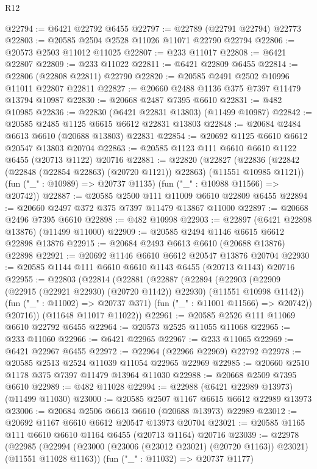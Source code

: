 \begin{lexlean}{R12}
\begin{coremodule}
@22794 := @6421 @22792 @6455
@22797 := @22789 (@22791 @22794) @22773
@22803 := @20585 @2504 @2528 @11026 @11071 @22790 @22794
@22806 := @20573 @2503 @11012 @11025
@22807 := @233 @11017
@22808 := @6421 @22807
@22809 := @233 @11022
@22811 := @6421 @22809 @6455
@22814 := @22806 (@22808 @22811) @22790
@22820 := @20585 @2491 @2502 @10996 @11011 @22807 @22811
@22827 := @20660 @2488 @1136 @375 @7397 @11479 @13794 @10987
@22830 := @20668 @2487 @7395 @6610
@22831 := @482 @10985
@22836 := @22830 (@6421 @22831 @13803) (@11499 @10987)
@22842 := @20585 @2485 @1125 @6615 @6612 @22831 @13803
@22848 := @20684 @2484 @6613 @6610 (@20688 @13803) @22831
@22854 := @20692 @1125 @6610 @6612 @20547 @13803 @20704
@22863 := @20585 @1123 @111 @6610 @6610 @1122 @6455 (@20713 @1122) @20716
@22881 := @22820
    (@22827
      (@22836 (@22842 (@22848 (@22854 @22863) (@20720 @1121)) @22863) (@11551 @10985 @1121))
      (fun ("_" : @10989) => @20737 @1135)
      (fun ("_" : @10988 @11566) => @20742))
@22887 := @20585 @2500 @111 @11009 @6610 @22809 @6455
@22894 := @20660 @2497 @372 @375 @7397 @11479 @13867 @11000
@22897 := @20668 @2496 @7395 @6610
@22898 := @482 @10998
@22903 := @22897 (@6421 @22898 @13876) (@11499 @11000)
@22909 := @20585 @2494 @1146 @6615 @6612 @22898 @13876
@22915 := @20684 @2493 @6613 @6610 (@20688 @13876) @22898
@22921 := @20692 @1146 @6610 @6612 @20547 @13876 @20704
@22930 := @20585 @1144 @111 @6610 @6610 @1143 @6455 (@20713 @1143) @20716
@22955 := @22803
    (@22814
      (@22881
        (@22887
          (@22894
            (@22903 (@22909 (@22915 (@22921 @22930) (@20720 @1142)) @22930) (@11551 @10998 @1142))
            (fun ("_" : @11002) => @20737 @371)
            (fun ("_" : @11001 @11566) => @20742))
          @20716))
      (@11648 @11017 @11022))
@22961 := @20585 @2526 @111 @11069 @6610 @22792 @6455
@22964 := @20573 @2525 @11055 @11068
@22965 := @233 @11060
@22966 := @6421 @22965
@22967 := @233 @11065
@22969 := @6421 @22967 @6455
@22972 := @22964 (@22966 @22969) @22792
@22978 := @20585 @2513 @2524 @11039 @11054 @22965 @22969
@22985 := @20660 @2510 @1178 @375 @7397 @11479 @13964 @11030
@22988 := @20668 @2509 @7395 @6610
@22989 := @482 @11028
@22994 := @22988 (@6421 @22989 @13973) (@11499 @11030)
@23000 := @20585 @2507 @1167 @6615 @6612 @22989 @13973
@23006 := @20684 @2506 @6613 @6610 (@20688 @13973) @22989
@23012 := @20692 @1167 @6610 @6612 @20547 @13973 @20704
@23021 := @20585 @1165 @111 @6610 @6610 @1164 @6455 (@20713 @1164) @20716
@23039 := @22978
    (@22985
      (@22994 (@23000 (@23006 (@23012 @23021) (@20720 @1163)) @23021) (@11551 @11028 @1163))
      (fun ("_" : @11032) => @20737 @1177)

\end{coremodule}
\end{lexlean}
